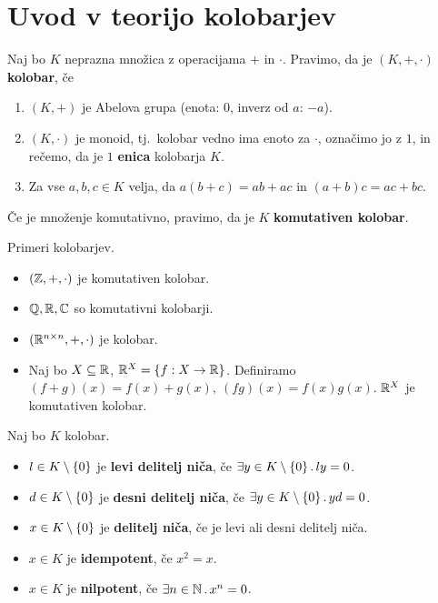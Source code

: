 \section{Uvod v teorijo kolobarjev}

\begin{definicija}
    Naj bo $K$ neprazna množica z operacijama $+$ in $\cdot$. Pravimo, da je $(K, +, \cdot)$ \textbf{kolobar}, če
    \begin{enumerate}
        \item $(K, +)$ je Abelova grupa (enota: $0$, inverz od $a$: $-a$).
        \item $(K, \cdot)$ je monoid, tj.\ kolobar vedno ima enoto za $\cdot$, označimo jo z $1$, in rečemo, da je $1$ \textbf{enica} kolobarja $K$.
        \item Za vse $a, b, c \in K$ velja, da $a(b+c) = ab+ac$ in $(a+b)c = ac+bc$.
    \end{enumerate}
    Če je množenje komutativno, pravimo, da je $K$ \textbf{komutativen kolobar}.
\end{definicija}

\begin{zgled}
    Primeri kolobarjev.
    \begin{itemize}
        \item $(\mathbb{Z}, +, \cdot)$ je komutativen kolobar.
        \item $\mathbb{Q}, \mathbb{R}, \mathbb{C}$ so komutativni kolobarji.
        \item $(\mathbb{R}^{n \times n}, +, \cdot)$ je kolobar.
        \item Naj bo $X \subseteq \mathbb{R}$, $\mathbb{R}^X = \{f: X \to \mathbb{R}\}$. Definiramo $(f+g)(x) = f(x) + g(x), \ (fg)(x) = f(x)g(x)$. $\mathbb{R}^X$ je komutativen kolobar.
    \end{itemize}
\end{zgled}

\begin{definicija}
    Naj bo $K$ kolobar.
    \begin{itemize}
        \item $l \in K \setminus \{0\}$ je \textbf{levi delitelj niča}, če $\exists y \in K \setminus \{0\} \,.\, ly = 0$.
        \item $d \in K \setminus \{0\}$ je \textbf{desni delitelj niča}, če $\exists y \in K \setminus \{0\} \,.\, yd = 0$.
        \item $x \in K \setminus \{0\}$ je \textbf{delitelj niča}, če je levi ali desni delitelj niča. 
        \item $x \in K$ je \textbf{idempotent}, če $x^2 = x$.
        \item $x \in K$ je \textbf{nilpotent}, če $\exists n \in \mathbb{N} \,.\, x^n = 0$.
    \end{itemize}
\end{definicija}

